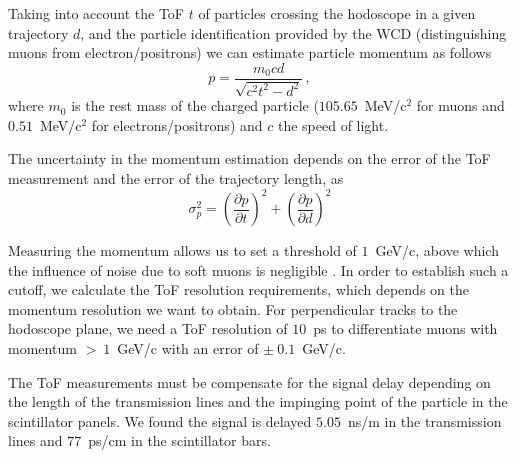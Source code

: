 \documentclass[letterpaper,11pt]{article}
\begin{document}

Taking into account the ToF $t$ of particles crossing the hodoscope in a given trajectory $d$, and the particle identification provided by the WCD (distinguishing muons from electron/positrons) we can estimate particle momentum as follows
\begin{equation}
p = \frac{m_0 c d}{\sqrt{c^2t^2-d^2}} \, ,
\end{equation}
where $m_0$ is the rest mass of the charged particle ($ 105.65$~MeV/c$^2$ for muons and $0.51$~MeV/c$^2$ for electrons/positrons) and $c$ the speed of light. 

The uncertainty in the momentum estimation depends on the error of the ToF measurement and the error of the trajectory length, as
\begin{equation}
\sigma_p^2 = \left( \frac{\partial p}{\partial t} \right)^2 + \left( \frac{\partial p}{\partial d} \right)^2
\end{equation}

Measuring the momentum allows us to set a threshold of $1$~GeV/c, above which the influence of noise due to soft muons is negligible \cite{nishiyama2016monte, nishiyama2014experimental, Olh2018, Olh2017, ambrosino2015joint}. In order to establish such a cutoff, we calculate the ToF resolution requirements, which depends on the momentum resolution we want to obtain. For perpendicular tracks to the hodoscope plane, we need a ToF resolution of $10$~ps to differentiate muons with momentum $>~1$~GeV/c with an error of $\pm~0.1$~GeV/c. 


The ToF measurements must be compensate for the signal delay depending on the length of the transmission lines and the impinging point of the particle in the scintillator panels. We found the signal is delayed $5.05$~ns/m in the transmission lines and $77$~ps/cm in the scintillator bars.
\end{document}
